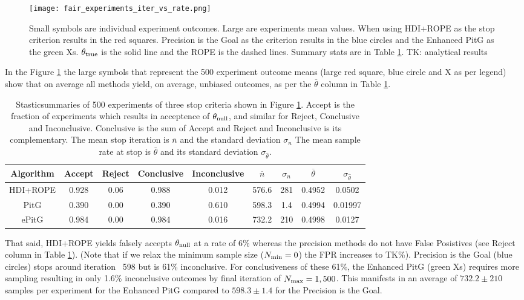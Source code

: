 \begin{figure}[h!]
  \centering
  \texttt{[image: fair\_experiments\_iter\_vs\_rate.png]}
  \caption{Small symbols are individual experiment outcomes. Large are experiments
  mean values. When using HDI+ROPE as the stop criterion results in the red squares.
  Precision is the Goal as the criterion results in the blue circles
  and the Enhanced PitG as the green Xs. $\theta_{\rm true}$ is the solid line and
  the ROPE is the dashed lines. Summary stats are in Table \ref{tab:fair_iter_vs_rate}. TK: analytical results
  }
  \label{fig:fair_iter_vs_rate}
\end{figure}

In the Figure \ref{fig:fair_iter_vs_rate} the large symbols that represent the 500 experiment outcome means 
(large red square, blue circle and X as per legend) show
that on average all methods yield, on average, unbiased outcomes, as per the
$\overline{\theta}$ column in Table \ref{tab:fair_iter_vs_rate}.


\begin{table}[h!]\label{tab:fair_iter_vs_rate}
  \begin{center}
  \begin{tabular}{c|c|c|c|c|c|c|c|c}
    \hline
    Algorithm & Accept & Reject & Conclusive & Inconclusive & $\overline{n}$ & $\sigma_n$ & $\overline{\theta}$ & $\sigma_{\hat{\theta}}$\\
    \hline
    HDI+ROPE & 0.928 & 0.06 & 0.988 & 0.012 & 576.6 & 281 & 0.4952 & 0.0502 \\
    PitG & 0.390 & 0.00 & 0.390 & 0.610 & 598.3 & 1.4 & 0.4994 & 0.01997 \\
    ePitG & 0.984 & 0.00 & 0.984 & 0.016 & 732.2 & 210 & 0.4998 & 0.0127\\
    \hline
  \end{tabular}
  \caption{Stasticsummaries of 500 experiments of three stop criteria shown in Figure \ref{fig:fair_iter_vs_rate}. Accept
  is the fraction of experiments which results in acceptence of $\theta_{\rm null}$,
  and similar for Reject, Conclusive and Inconclusive. Conclusive is the sum of Accept and Reject and Inconclusive is its complementary. The mean stop iteration is $\overline{n}$ and the standard deviation $\sigma_n$
  The mean sample rate at stop is $\overline{\theta}$ and its standard deviation $\sigma_{\hat{\theta}}$.
  }
\end{center}
\end{table}

That said, HDI+ROPE yields falsely accepts $\theta_{\rm null}$ at a rate of 6\% 
whereas the precision methods do not have False Posistives (see Reject column in Table \ref{tab:fair_iter_vs_rate}).
(Note that if we relax the minimum sample size ($N_{\rm min}=0$) the FPR increases to TK\%).
Precision is the Goal (blue circles) stops around iteration ~598 but is 61\% inconclusive.
For conclusiveness of these 61\%, the Enhanced PitG (green Xs) requires more sampling 
resulting in only 1.6\% inconclusive outcomes by final iteration of $N_{\rm max}=1,500$.
This manifests in an average of $732.2\pm 210$ samples per experiment for the Enhanced PitG
compared to $598.3\pm 1.4$ for the Precision is the Goal.

